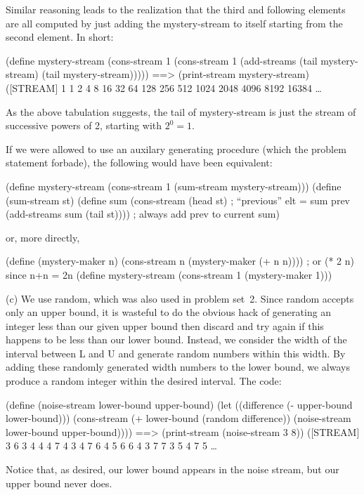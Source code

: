 Similar reasoning leads to the realization that the third and following
elements are all computed by just adding the {\cf mystery-stream} to itself
starting from the second element. In short:

\beginlisp
(define mystery-stream
 (cons-stream 1
              (cons-stream 1
                           (add-streams (tail mystery-stream)
                                        (tail mystery-stream)))))
\null
==> (print-stream mystery-stream)
([STREAM] 1 1 2 4 8 16 32 64 128 256 512 1024 2048 4096 8192 16384 \ldots
\endlisp

As the above tabulation suggests, the tail of {\cf mystery-stream} is just the
stream of successive powers of 2, starting with $2^0 = 1$.

If we were allowed to use an auxilary generating procedure (which the problem
statement forbade), the following would have been equivalent:

\beginlisp
(define mystery-stream (cons-stream 1 (sum-stream mystery-stream)))
\null
(define (sum-stream st)
  (define sum (cons-stream (head st)                     ; ``previous'' elt = sum prev
                           (add-streams sum (tail st)))) ; always add prev to current
  sum)
\endlisp

or, more directly,

\beginlisp
(define (mystery-maker n)
  (cons-stream n (mystery-maker (+ n n))))   ; or (* 2 n) since n+n = 2n
\null
(define mystery-stream (cons-stream 1 (mystery-maker 1)))
\endlisp

(c) We use {\cf random}, which was also used in problem set~2. Since {\cf
random} accepts only an upper bound, it is wasteful to do the obvious hack of
generating an integer less than our given upper bound then discard and try
again if this happens to be less than our lower bound. Instead, we consider the
width of the interval between L and U and generate random numbers within this
width. By adding these randomly generated width numbers to the lower bound, we
always produce a random integer within the desired interval. The code:

\beginlisp
(define (noise-stream lower-bound upper-bound)
  (let ((difference (- upper-bound lower-bound)))
    (cons-stream (+ lower-bound (random difference))
                 (noise-stream lower-bound upper-bound))))
\null
==> (print-stream (noise-stream 3 8))
([STREAM] 3 6 3 4 4 4 7 4 3 4 7 6 4 5 6 6 4 3 7 7 3 5 4 7 5 \ldots
\endlisp

Notice that, as desired, our lower bound appears in the noise stream, but our
upper bound never does.

